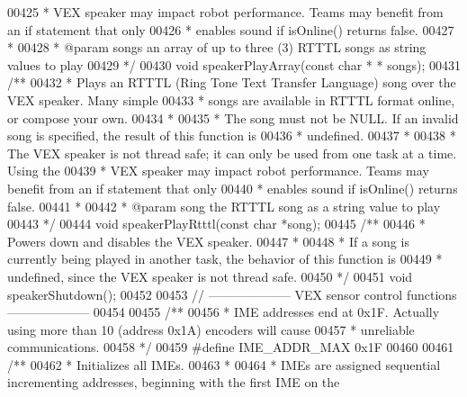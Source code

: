 \begin{DoxyCode}
00425 \textcolor{comment}{ * VEX speaker may impact robot performance. Teams may benefit from an if statement that only}
00426 \textcolor{comment}{ * enables sound if isOnline() returns false.}
00427 \textcolor{comment}{ *}
00428 \textcolor{comment}{ * @param songs an array of up to three (3) RTTTL songs as string values to play}
00429 \textcolor{comment}{ */}
00430 \textcolor{keywordtype}{void} speakerPlayArray(\textcolor{keyword}{const} \textcolor{keywordtype}{char} * * songs);
00431 \textcolor{comment}{/**}
00432 \textcolor{comment}{ * Plays an RTTTL (Ring Tone Text Transfer Language) song over the VEX speaker. Many simple}
00433 \textcolor{comment}{ * songs are available in RTTTL format online, or compose your own.}
00434 \textcolor{comment}{ *}
00435 \textcolor{comment}{ * The song must not be NULL. If an invalid song is specified, the result of this function is}
00436 \textcolor{comment}{ * undefined.}
00437 \textcolor{comment}{ *}
00438 \textcolor{comment}{ * The VEX speaker is not thread safe; it can only be used from one task at a time. Using the}
00439 \textcolor{comment}{ * VEX speaker may impact robot performance. Teams may benefit from an if statement that only}
00440 \textcolor{comment}{ * enables sound if isOnline() returns false.}
00441 \textcolor{comment}{ *}
00442 \textcolor{comment}{ * @param song the RTTTL song as a string value to play}
00443 \textcolor{comment}{ */}
00444 \textcolor{keywordtype}{void} speakerPlayRtttl(\textcolor{keyword}{const} \textcolor{keywordtype}{char} *song);
00445 \textcolor{comment}{/**}
00446 \textcolor{comment}{ * Powers down and disables the VEX speaker.}
00447 \textcolor{comment}{ *}
00448 \textcolor{comment}{ * If a song is currently being played in another task, the behavior of this function is}
00449 \textcolor{comment}{ * undefined, since the VEX speaker is not thread safe.}
00450 \textcolor{comment}{ */}
00451 \textcolor{keywordtype}{void} speakerShutdown();
00452 
00453 \textcolor{comment}{// -------------------- VEX sensor control functions --------------------}
00454 
00455 \textcolor{comment}{/**}
00456 \textcolor{comment}{ * IME addresses end at 0x1F. Actually using more than 10 (address 0x1A) encoders will cause}
00457 \textcolor{comment}{ * unreliable communications.}
00458 \textcolor{comment}{ */}
00459 \textcolor{preprocessor}{#}\textcolor{preprocessor}{define} \textcolor{preprocessor}{IME\_ADDR\_MAX} 0x1F
00460 
00461 \textcolor{comment}{/**}
00462 \textcolor{comment}{ * Initializes all IMEs.}
00463 \textcolor{comment}{ *}
00464 \textcolor{comment}{ * IMEs are assigned sequential incrementing addresses, beginning with the first IME on the}

\end{DoxyCode}
